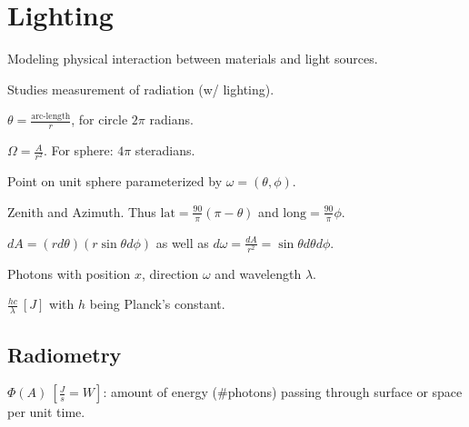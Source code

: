 \section{Lighting}

\begin{definition}[Lighting]
  Modeling physical interaction between materials and light sources.
\end{definition}

\begin{definition}[Radiometry]
  Studies measurement of radiation (w/ lighting).
\end{definition}

\begin{definition}[Angle]
  \(\theta = \frac{\text{arc-length}}{r}\), for circle \(2 \pi\) radians.
\end{definition}

\begin{definition}
  \(\Omega = \frac{A}{r^2}\).
  For sphere: \(4\pi\) steradians.
\end{definition}

\begin{definition}[Angle]
  Point on unit sphere parameterized by \(\omega = (\theta, \phi)\).

  Zenith and Azimuth.
  Thus \(\text{lat} =\frac{90}{\pi}(\pi - \theta)\) and \(\text{long} = \frac{90}{\pi}\phi\).
\end{definition}

\begin{definition}
  \(dA = (rd\theta)(r \sin \theta d \phi)\) as well as
  \(d\omega = \frac{dA}{r^2} = \sin \theta d \theta d \phi\).
\end{definition}

\begin{definition}[Light]
  Photons with position \(x\), direction \(\omega\) and wavelength \(\lambda\).
\end{definition}

\begin{definition}
  \(\frac{hc}{\lambda} \ [J]\) with \(h\) being Planck's  constant.
\end{definition}

\subsection{Radiometry}
\begin{definition}
  \(\Phi(A) \ \left[\frac{J}{s} = W\right]\): amount of energy (\#photons) passing through surface or space per unit time.
\end{definition}

